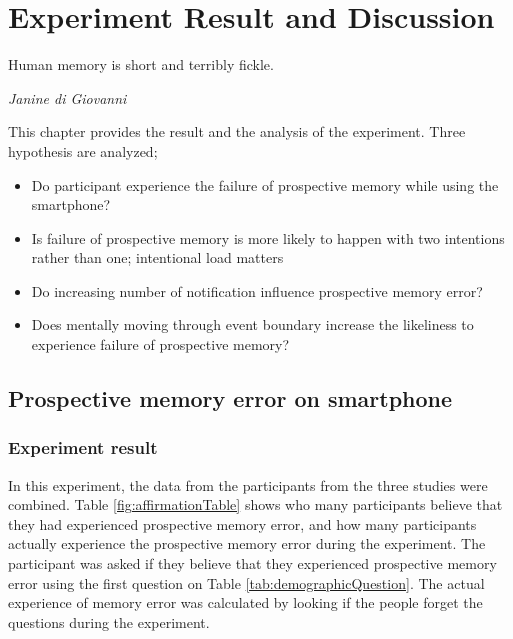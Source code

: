 \chapter{Experiment Result and Discussion}

\epigraph{Human memory is short and terribly fickle.}{\textit{Janine di Giovanni}}


This chapter provides the result and the analysis of the experiment. Three hypothesis are analyzed;
\begin{itemize}
  \item{Do participant experience the failure of prospective memory while using the smartphone?}
  \item{Is failure of prospective memory is more likely to happen with two intentions rather than one; intentional load matters}
  \item{Do increasing number of notification influence prospective memory error?}
  \item{Does mentally moving through event boundary increase the likeliness to experience failure of prospective memory?}
\end{itemize}

\section{Prospective memory error on smartphone}

\subsection{Experiment result}
In this experiment, the data from the participants from the three studies were combined.
Table \ref{fig:affirmationTable} shows who many participants believe that they had experienced prospective memory error,
and how many participants actually experience the prospective memory error during the experiment.
The participant was asked if they believe that they experienced prospective memory error using the first question on Table \ref{tab:demographicQuestion}.
The actual experience of memory error was calculated by looking if the people forget the questions during the experiment.


